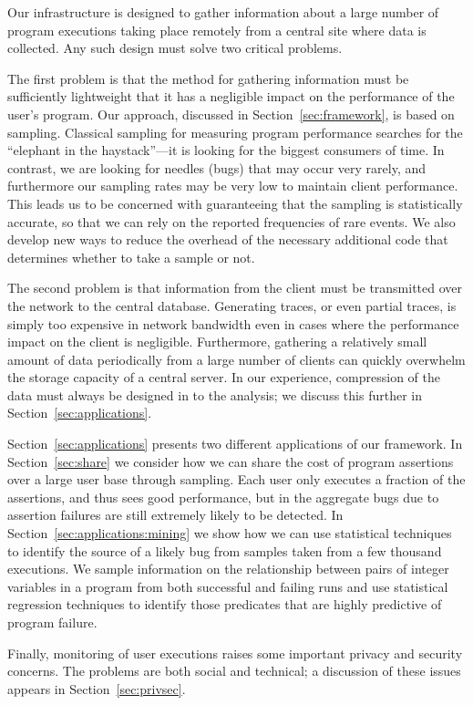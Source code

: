 Our infrastructure is designed to gather information about a
large number of program executions taking place remotely from
a central site where data is collected.  Any such design must solve
two critical problems.  

The first problem is that the method for gathering information must be
sufficiently lightweight that it has a negligible impact on the
performance of the user's program.  Our approach, discussed in
Section~\ref{sec:framework}, is based on sampling.  Classical sampling
for measuring program performance searches for the ``elephant in the
haystack''---it is looking for the biggest consumers of time.  In
contrast, we are looking for needles (bugs) that may occur very
rarely, and furthermore our sampling rates may be very low to maintain
client performance.  This leads us to be concerned with guaranteeing
that the sampling is statistically accurate, so that we can rely on
the reported frequencies of rare events.  We also develop new ways to
reduce the overhead of the necessary additional code that determines
whether to take a sample or not.

The second problem is that information from the client must be
transmitted over the network to the central database.  
Generating traces, or even partial traces, is simply too expensive in
network bandwidth even in cases where the performance impact on the
client is negligible.  Furthermore, gathering a relatively small
amount of data periodically from a large number of clients can
quickly overwhelm the storage capacity of a central server.  In our
experience, compression of the data must always be designed in to
the analysis; we discuss this further in Section~\ref{sec:applications}. 

Section~\ref{sec:applications} presents two different applications of our
framework.  In Section~\ref{sec:share} we consider how we can share the
cost of program assertions over a large user base through sampling.
Each user only executes a fraction of the assertions, and thus sees
good performance, but in the aggregate bugs due to assertion failures
are still extremely likely to be detected.  In Section~\ref{sec:applications:mining} we
show how we can use statistical techniques to identify the source of a
likely bug from samples taken from a few thousand executions.  We
sample information on the relationship between pairs of integer
variables in a program from both successful and failing runs and use
statistical regression techniques to identify those predicates that are
highly predictive of program failure.

Finally, monitoring of user executions raises some important privacy
and security concerns.  The problems are both social and technical; a
discussion of these issues appears in Section~\ref{sec:privsec}.

